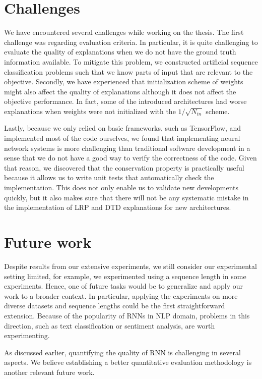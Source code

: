 \section{Challenges}
We have encountered several challenges while working on the thesis. The first challenge was regarding evaluation criteria. In particular, it is quite challenging to evaluate the quality of explanations when we do not have the ground truth information available. To mitigate this problem, we constructed artificial sequence classification problems such that we know parts of input that are relevant to the objective.  Secondly, we have experienced that initialization scheme of weights might also affect the quality of explanations although it does not affect the objective performance. In fact, some of the introduced architectures had worse explanations when weights were not initialized with the $1/\sqrt{N_{in}}$ scheme.

Lastly, because we only relied on basic frameworks, such as TensorFlow, and implemented most of the code ourselves, we found that implementing neural network systems is more challenging than traditional software development in a sense that we do not have a good way to verify the correctness of the code. Given that reason, we discovered that the conservation property is practically useful because it allows us to write unit tests that automatically check the implementation. This does not only enable us to validate new developments quickly, but it also makes sure that there will not be any systematic mistake in the implementation of LRP and DTD explanations for new architectures.


\section{Future work}
Despite results from our extensive experiments, we still consider our experimental setting limited, for example, we experimented using a sequence length in some experiments.  Hence, one of future tasks would be to generalize and apply our work to a broader context. In particular,  applying the experiments on more diverse datasets and sequence lengths could be the first straightforward extension. Because of the popularity of RNNs in NLP domain, problems in this direction, such as text classification or sentiment analysis, are worth experimenting. 

As discussed earlier, quantifying the quality of RNN is challenging in several aspects. We believe establishing a better quantitative evaluation methodology is another relevant future work.

